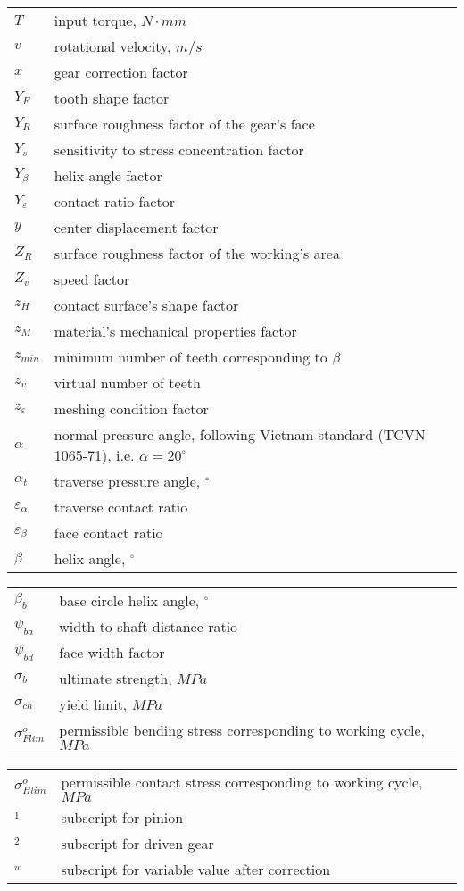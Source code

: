 \begin{tabular}[t]{lp{6.5cm}}
	$ T $ & input torque, $ \unit{N\cdot mm} $\\
	$ v $ & rotational velocity, $ \unit{m/s} $\\
	$ x $ & gear correction factor\\
	$ Y_F $ & tooth shape factor\\
	$ Y_R $ & surface roughness factor of the gear's face\\
	$ Y_s $ & sensitivity to stress concentration factor\\
	$ Y_\beta $ & helix angle factor\\
	$ Y_\varepsilon $ & contact ratio factor\\
	$ y $ & center displacement factor\\
	$ Z_R $ & surface roughness factor of the working's area\\
	$ Z_v $ & speed factor\\
	$ z_H $ & contact surface's shape factor\\
	$ z_M $ & material's mechanical properties factor \\
	$ z_{min} $ & minimum number of teeth corresponding to $ \beta $\\
	$ z_v $ & virtual number of teeth\\
	$ z_\varepsilon $ & meshing condition factor\\
	$ \alpha $ & normal pressure angle, following Vietnam standard (TCVN 1065-71), i.e. $ \alpha = 20^\circ $\\
	$ \alpha_t $ & traverse pressure angle, $ ^\circ $\\
	$ \varepsilon_\alpha $ & traverse contact ratio\\
	$ \varepsilon_\beta $ & face contact ratio\\
	$ \beta $ & helix angle, $ ^\circ $\\
\end{tabular}\newpage
\begin{tabular}[t]{lp{6.5cm}}
	$ \beta_b $ & base circle helix angle, $ ^\circ $\\
	$ \psi_{ba} $ & width to shaft distance ratio\\
	$ \psi_{bd} $ & face width factor \\
	$ \sigma_b $ & ultimate strength, $ \unit{MPa} $\\
	$ \sigma_{ch} $ & yield limit, $ \unit{MPa} $\\
	$ \sigma_{Flim}^o $ & permissible bending stress corresponding to working cycle, $ \unit{MPa} $\\
\end{tabular}
\begin{tabular}[t]{lp{6.5cm}}
	$ \sigma_{Hlim}^o $ & permissible contact stress corresponding to working cycle, $ \unit{MPa} $\\
	$ _1 $ & subscript for pinion\\
	$ _2 $ & subscript for driven gear\\
	$ _w $ & subscript for variable value after correction\\
\end{tabular}

